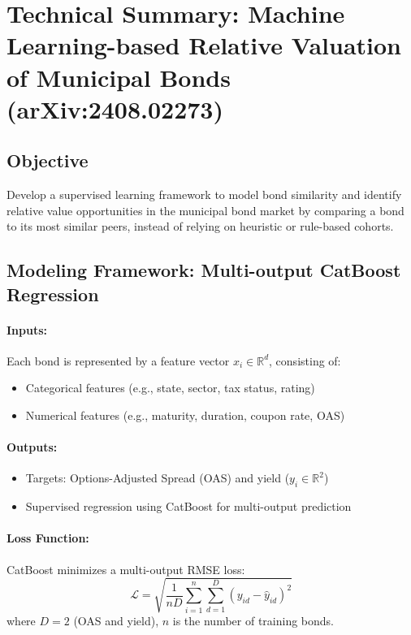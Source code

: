 \documentclass{article}
\begin{document}
\section*{Technical Summary: Machine Learning-based Relative Valuation of Municipal Bonds \\ \small{(arXiv:2408.02273)}}

\subsection*{Objective}
Develop a supervised learning framework to model bond similarity and identify relative value opportunities in the municipal bond market by comparing a bond to its most similar peers, instead of relying on heuristic or rule-based cohorts.

\subsection*{Modeling Framework: Multi-output CatBoost Regression}

\paragraph{Inputs:}
Each bond is represented by a feature vector $x_i \in \mathbb{R}^d$, consisting of:
\begin{itemize}[nosep]
    \item Categorical features (e.g., state, sector, tax status, rating)
    \item Numerical features (e.g., maturity, duration, coupon rate, OAS)
\end{itemize}

\paragraph{Outputs:}
\begin{itemize}[nosep]
    \item Targets: Options-Adjusted Spread (OAS) and yield ($y_i \in \mathbb{R}^2$)
    \item Supervised regression using CatBoost for multi-output prediction
\end{itemize}

\paragraph{Loss Function:}
CatBoost minimizes a multi-output RMSE loss:
\[
\mathcal{L} = \sqrt{\frac{1}{nD} \sum_{i=1}^n \sum_{d=1}^D (y_{id} - \hat{y}_{id})^2}
\]
where $D=2$ (OAS and yield), $n$ is the number of training bonds.
\end{document}
